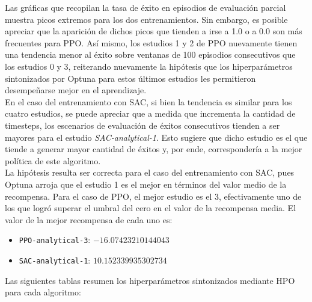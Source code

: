 Las gráficas que recopilan la tasa de éxito en episodios de evaluación parcial muestra picos extremos para los dos entrenamientos. Sin embargo, es posible apreciar que la aparición de dichos picos que tienden a irse a 1.0 o a 0.0 son más frecuentes para PPO. Así mismo, los estudios 1 y 2 de PPO nuevamente tienen una tendencia menor al éxito sobre ventanas de 100 episodios consecutivos que los estudios 0 y 3, reiterando nuevamente la hipótesis que los hiperparámetros sintonizados por Optuna para estos últimos estudios les permitieron desempeñarse mejor en el aprendizaje. \\

En el caso del entrenamiento con SAC, si bien la tendencia es similar para los cuatro estudios, se puede apreciar que a medida que incrementa la cantidad de timesteps, los escenarios de evaluación de éxitos consecutivos tienden a ser mayores para el estudio \emph{SAC-analytical-1}. Esto sugiere que dicho estudio es el que tiende a generar mayor cantidad de éxitos y, por ende, correspondería a la mejor política de este algoritmo. \\

La hipótesis resulta ser correcta para el caso del entrenamiento con SAC, pues Optuna arroja que el estudio 1 es el mejor en términos del valor medio de la recompensa. Para el caso de PPO, el mejor estudio es el 3, efectivamente uno de los que logró superar el umbral del cero en el valor de la recompensa media. El valor de la mejor recompensa de cada uno es:

\begin{itemize}
	\item \texttt{PPO-analytical-3}: $-16.07423210144043$
	\item \texttt{SAC-analytical-1}: $10.152339935302734$\\
\end{itemize}

Las siguientes tablas resumen los hiperparámetros sintonizados mediante HPO para cada algoritmo:\\

